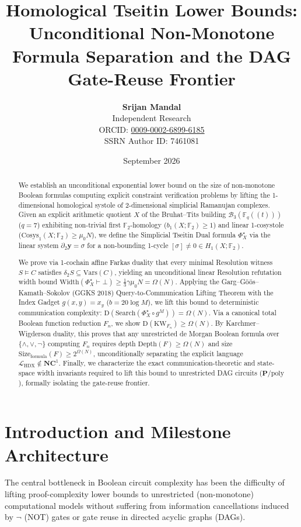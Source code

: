 \documentclass[11pt,a4paper]{article}
\title{\textbf{Homological Tseitin Lower Bounds: Unconditional Non-Monotone Formula Separation and the DAG Gate-Reuse Frontier}}
\author{\textbf{Srijan Mandal} \\ Independent Research \\ ORCID: \href{https://orcid.org/0009-0002-6899-6185}{0009-0002-6899-6185} \\ SSRN Author ID: 7461081}
\date{September 2026}
\theoremstyle{definition}
\newcommand{\KW}{\mathrm{KW}}
\newcommand{\Width}{\mathrm{Width}}
\newcommand{\Size}{\mathrm{Size}}
\newcommand{\Depth}{\mathrm{Depth}}
\newcommand{\Vars}{\mathrm{Vars}}
\begin{document}
\maketitle

\begin{abstract}
We establish an unconditional exponential lower bound on the size of non-monotone Boolean formulas computing explicit constraint verification problems by lifting the 1-dimensional homological systole of 2-dimensional simplicial Ramanujan complexes.
Given an explicit arithmetic quotient $X$ of the Bruhat--Tits building $\mathcal{B}_3(\mathbb{F}_q((t)))$ ($q=7$) exhibiting non-trivial first $\mathbb{F}_2$-homology ($b_1(X; \mathbb{F}_2) \ge 1$) and linear 1-cosystole ($\mathrm{Cosys}_1(X; \mathbb{F}_2) \ge \mu_0 N$), we define the Simplicial Tseitin Dual formula $\Phi_X^\star$ via the linear system $\partial_2 \mathbf{y} = \sigma$ for a non-bounding 1-cycle $[\sigma] \neq 0 \in H_1(X; \mathbb{F}_2)$.

We prove via 1-cochain affine Farkas duality that every minimal Resolution witness $S \models C$ satisfies $\delta_2 S \subseteq \Vars(C)$, yielding an unconditional linear Resolution refutation width bound $\Width(\Phi_X^\star \vdash \bot) \ge \frac{1}{3}\gamma \mu_0 N = \Omega(N)$.
Applying the Garg--Göös--Kamath--Sokolov (GGKS 2018) Query-to-Communication Lifting Theorem with the Index Gadget $g(x,y)=x_y$ ($b = 20\log M$), we lift this bound to deterministic communication complexity: $\mathrm{D}(\mathrm{Search}(\Phi_X^\star \circ g^M)) = \Omega(N)$.
Via a canonical total Boolean function reduction $F_n$, we show $\mathrm{D}(\KW_{F_n}) \ge \Omega(N)$.
By Karchmer--Wigderson duality, this proves that any unrestricted de Morgan Boolean formula over $\{\wedge, \vee, \neg\}$ computing $F_n$ requires depth $\Depth(F) \ge \Omega(N)$ and size $\Size_{\mathrm{formula}}(F) \ge 2^{\Omega(N)}$, unconditionally separating the explicit language $\mathcal{L}_{\mathrm{HDX}} \notin \mathbf{NC}^1$.
Finally, we characterize the exact communication-theoretic and state-space width invariants required to lift this bound to unrestricted DAG circuits ($\mathbf{P}/\mathrm{poly}$), formally isolating the gate-reuse frontier.
\end{abstract}

\section{Introduction and Milestone Architecture}
The central bottleneck in Boolean circuit complexity has been the difficulty of lifting proof-complexity lower bounds to unrestricted (non-monotone) computational models without suffering from information cancellations induced by $\neg$ (NOT) gates or gate reuse in directed acyclic graphs (DAGs).
\end{document}
